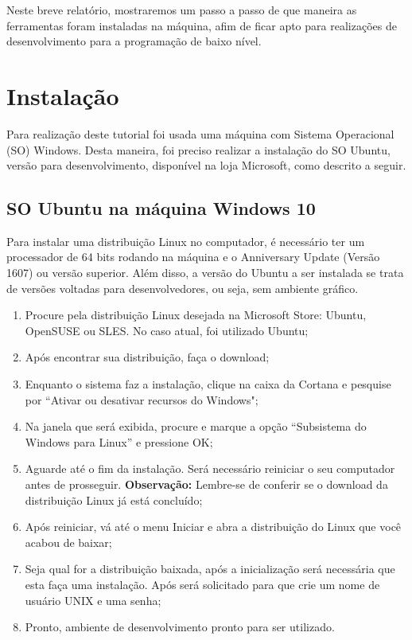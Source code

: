 \documentclass[12pt]{article}
\begin{document}
Neste breve relatório, mostraremos um passo a passo de que maneira as ferramentas foram instaladas na máquina, afim de ficar apto para realizações de desenvolvimento para a programação de baixo nível.

\section{Instalação} \label{sec:firstpage}

Para realização deste tutorial foi usada uma máquina com Sistema Operacional (SO) Windows. Desta maneira, foi preciso realizar a instalação do SO Ubuntu, versão para desenvolvimento, disponível na loja Microsoft, como descrito a seguir.

\subsection{SO Ubuntu na máquina Windows 10}

Para instalar uma distribuição Linux no computador, é necessário ter um processador de 64 bits rodando na máquina e o Anniversary Update (Versão 1607) ou versão superior. Além disso, a versão do Ubuntu a ser instalada se trata de versões voltadas para desenvolvedores, ou seja, sem ambiente gráfico.

 \begin{enumerate}
   \item Procure pela distribuição Linux desejada na Microsoft Store: Ubuntu, OpenSUSE ou SLES. No caso atual, foi utilizado Ubuntu;
   \item Após encontrar sua distribuição, faça o download;
   \item Enquanto o sistema faz a instalação, clique na caixa da Cortana e pesquise por “Ativar ou desativar recursos do Windows";
   \item Na janela que será exibida, procure e marque a opção “Subsistema do Windows para Linux” e pressione OK;
   \item Aguarde até o fim da instalação. Será necessário reiniciar o seu computador antes de prosseguir. \textbf{Observação:} Lembre-se de conferir se o download da distribuição Linux já está concluído;
   \item Após reiniciar, vá até o menu Iniciar e abra a distribuição do Linux que você acabou de baixar;
   \item Seja qual for a distribuição baixada, após a inicialização será necessária que esta faça uma instalação. Após será solicitado para que crie um nome de usuário UNIX e uma senha;
   \item Pronto, ambiente de desenvolvimento pronto para ser utilizado.
 \end{enumerate}
\end{document}
